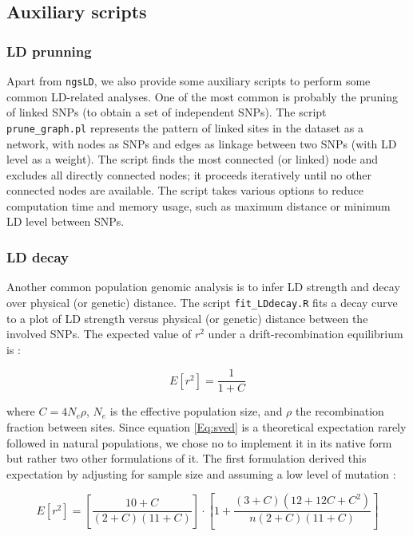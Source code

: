 \documentclass[a4paper]{article}
\begin{document}
\subsection{Auxiliary scripts}
\subsubsection{LD prunning}
Apart from \verb|ngsLD|, we also provide some auxiliary scripts to perform some common LD-related analyses. One of the most common is probably the pruning of linked SNPs (to obtain a set of independent SNPs). The script \verb|prune_graph.pl| represents the pattern of linked sites in the dataset as a network, with nodes as SNPs and edges as linkage between two SNPs (with LD level as a weight). The script finds the most connected (or linked) node and excludes all directly connected nodes; it proceeds iteratively until no other connected nodes are available. The script takes various options to reduce computation time and memory usage, such as maximum distance or minimum LD level between SNPs.\\

\subsubsection{LD decay}
Another common population genomic analysis is to infer LD strength and decay over physical (or genetic) distance. The script \verb|fit_LDdecay.R| fits a decay curve to a plot of LD strength versus physical (or genetic) distance between the involved SNPs. The expected value of $r^2$ under a drift-recombination equilibrium is \citep{Sved1971}:

\vspace{5pt}
\begin{equation}
E[r^2] = \frac{1}{1 + C}
\label{Eq:sved}
\end{equation}
\vspace{5pt}

\noindent where $C = 4N_e\rho$, $N_e$ is the effective population size, and $\rho$ the recombination fraction between sites. Since equation \ref{Eq:sved} is a theoretical expectation rarely followed in natural populations, we chose no to implement it in its native form but rather two other formulations of it. The first formulation derived this expectation by adjusting for sample size and assuming a low level of mutation \citep{Hill1988}:

\vspace{5pt}
\begin{equation}
E[r^2] = \left[ \frac{10 + C}{(2+C)(11+C)} \right] \cdot \left[ 1 + \frac{(3+C)(12+12C+C^2)}{n(2+C)(11+C)} \right]
\label{Eq:hill}
\end{equation}
\vspace{5pt}
\end{document}
